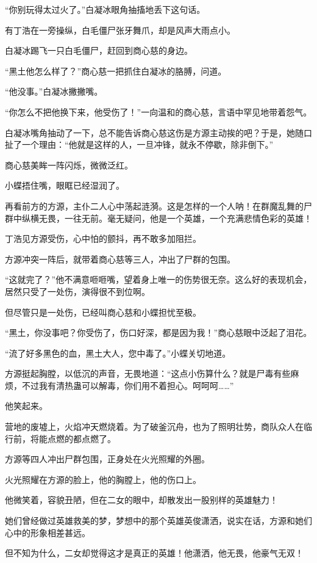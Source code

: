 \begin{this_body}
“你别玩得太过火了。”白凝冰眼角抽搐地丢下这句话。

有丁浩在一旁操纵，白毛僵尸张牙舞爪，却是风声大雨点小。

白凝冰踢飞一只白毛僵尸，赶回到商心慈的身边。

“黑土他怎么样了？”商心慈一把抓住白凝冰的胳膊，问道。

“他没事。”白凝冰撇撇嘴。

“你怎么不把他换下来，他受伤了！”一向温和的商心慈，言语中罕见地带着怨气。

白凝冰嘴角抽动了一下，总不能告诉商心慈这伤是方源主动挨的吧？于是，她随口扯了一个理由：“他就是这样的人，一旦冲锋，就永不停歇，除非倒下。”

商心慈美眸一阵闪烁，微微泛红。

小蝶捂住嘴，眼眶已经湿润了。

再看前方的方源，主仆二人心中荡起涟漪。这是怎样的一个人呐！在群魔乱舞的尸群中纵横无畏，一往无前。毫无疑问，他是一个英雄，一个充满悲情色彩的英雄！

丁浩见方源受伤，心中怕的颤抖，再不敢多加阻拦。

方源冲突一阵后，就带着商心慈等三人，冲出了尸群的包围。

“这就完了？”他不满意咂咂嘴，望着身上唯一的伤势很无奈。这么好的表现机会，居然只受了一处伤，演得很不到位啊。

但尽管只是一处伤，已经叫商心慈和小蝶担忧至极。

“黑土，你没事吧？你受伤了，伤口好深，都是因为我！”商心慈眼中泛起了泪花。

“流了好多黑色的血，黑土大人，您中毒了。”小蝶关切地道。

方源挺起胸膛，以低沉的声音，无畏地道：“这点小伤算什么？就是尸毒有些麻烦，不过我有清热蛊可以解毒，你们用不着担心。呵呵呵……”

他笑起来。

营地的废墟上，火焰冲天燃烧着。为了破釜沉舟，也为了照明壮势，商队众人在临行前，将能点燃的都点燃了。

方源等四人冲出尸群包围，正身处在火光照耀的外圈。

火光照耀在方源的脸上，他的胸膛上，他的伤口上。

他微笑着，容貌丑陋，但在二女的眼中，却散发出一股别样的英雄魅力！

她们曾经做过英雄救美的梦，梦想中的那个英雄英俊潇洒，说实在话，方源和她们心中的形象相差甚远。

但不知为什么，二女却觉得这才是真正的英雄！他潇洒，他无畏，他豪气无双！


\end{this_body}
